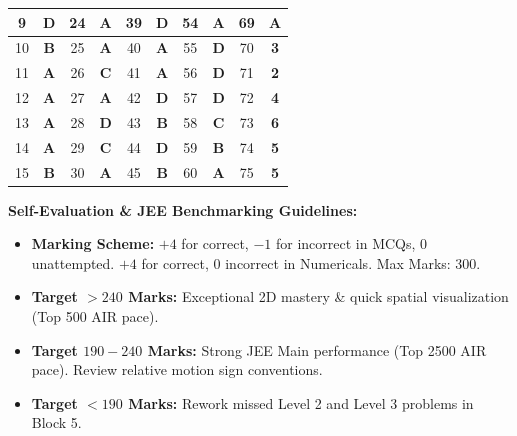 \documentclass[11pt,a4paper]{article}
\begin{document}
\begin{center}
\begin{tabular}{|c|c||c|c||c|c||c|c||c|c|}
\hline
\rowcolor{white}
9 & \textbf{\textcolor{l1Green}{D}} & 24 & \textbf{\textcolor{l1Green}{A}} & 39 & \textbf{\textcolor{l2Amber}{D}} & 54 & \textbf{\textcolor{l3Crimson}{A}} & 69 & \textbf{\textcolor{l3Crimson}{A}} \\
\hline
\rowcolor{tableStripe}
10 & \textbf{\textcolor{l1Green}{B}} & 25 & \textbf{\textcolor{l1Green}{A}} & 40 & \textbf{\textcolor{l2Amber}{A}} & 55 & \textbf{\textcolor{l3Crimson}{D}} & 70 & \textbf{\textcolor{l3Crimson}{3}} \\
\hline
\rowcolor{white}
11 & \textbf{\textcolor{l1Green}{A}} & 26 & \textbf{\textcolor{l2Amber}{C}} & 41 & \textbf{\textcolor{l2Amber}{A}} & 56 & \textbf{\textcolor{l3Crimson}{D}} & 71 & \textbf{\textcolor{l3Crimson}{2}} \\
\hline
\rowcolor{tableStripe}
12 & \textbf{\textcolor{l1Green}{A}} & 27 & \textbf{\textcolor{l2Amber}{A}} & 42 & \textbf{\textcolor{l2Amber}{D}} & 57 & \textbf{\textcolor{l3Crimson}{D}} & 72 & \textbf{\textcolor{l3Crimson}{4}} \\
\hline
\rowcolor{white}
13 & \textbf{\textcolor{l1Green}{A}} & 28 & \textbf{\textcolor{l2Amber}{D}} & 43 & \textbf{\textcolor{l2Amber}{B}} & 58 & \textbf{\textcolor{l3Crimson}{C}} & 73 & \textbf{\textcolor{l3Crimson}{6}} \\
\hline
\rowcolor{tableStripe}
14 & \textbf{\textcolor{l1Green}{A}} & 29 & \textbf{\textcolor{l2Amber}{C}} & 44 & \textbf{\textcolor{l2Amber}{D}} & 59 & \textbf{\textcolor{l3Crimson}{B}} & 74 & \textbf{\textcolor{l3Crimson}{5}} \\
\hline
\rowcolor{white}
15 & \textbf{\textcolor{l1Green}{B}} & 30 & \textbf{\textcolor{l2Amber}{A}} & 45 & \textbf{\textcolor{l2Amber}{B}} & 60 & \textbf{\textcolor{l3Crimson}{A}} & 75 & \textbf{\textcolor{l3Crimson}{5}} \\
\hline
\end{tabular}
\end{center}

\vspace{10pt}
\begin{tcolorbox}[theorycard]
\footnotesize
\textbf{\textcolor{primaryDark}{Self-Evaluation \& JEE Benchmarking Guidelines:}}
\begin{itemize}[leftmargin=12pt,itemsep=2pt]
  \item \textbf{Marking Scheme:} $+4$ for correct, $-1$ for incorrect in MCQs, $0$ unattempted. $+4$ for correct, $0$ incorrect in Numericals. Max Marks: 300.
  \item \textbf{\textcolor{l1Green}{Target $> 240$ Marks:}} Exceptional 2D mastery \& quick spatial visualization (Top 500 AIR pace).
  \item \textbf{\textcolor{l2Amber}{Target $190 - 240$ Marks:}} Strong JEE Main performance (Top 2500 AIR pace). Review relative motion sign conventions.
  \item \textbf{\textcolor{l3Crimson}{Target $< 190$ Marks:}} Rework missed Level 2 and Level 3 problems in Block 5.
\end{itemize}
\end{tcolorbox}
\end{document}
